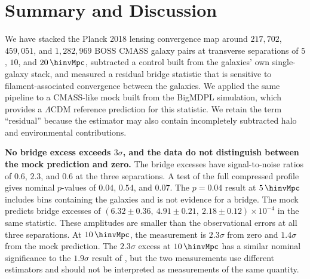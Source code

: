 %

\section{Summary and Discussion}
\label{sec:discussion}

We have stacked the Planck 2018 lensing convergence map around $217{,}702$,
$459{,}051$, and $1{,}282{,}969$ BOSS CMASS galaxy pairs at transverse
separations of $5$, $10$, and $20\,\hinvMpc$,
subtracted a control built from the galaxies' own single-galaxy stack, and
measured a residual bridge statistic that is sensitive to filament-associated
convergence between the galaxies. We applied the same pipeline to a
CMASS-like mock built from the BigMDPL simulation, which provides a
$\Lambda$CDM reference prediction for this statistic. We retain the term
``residual'' because the estimator may also contain incompletely subtracted
halo and environmental contributions.

\textbf{No bridge excess exceeds $3\sigma$, and the data do not distinguish
between the mock prediction and zero.} The bridge excesses have
signal-to-noise ratios of $0.6$, $2.3$, and $0.6$ at the three separations. A
test of the full compressed profile gives nominal $p$-values of $0.04$,
$0.54$, and $0.07$.
The $p=0.04$ result at $5\,\hinvMpc$ includes bins containing the galaxies and
is not evidence for a bridge. The mock predicts bridge excesses of
$\left(6.32\pm0.36,\ 4.91\pm0.21,\ 2.18\pm0.12\right)\times10^{-4}$ in the
same statistic. These amplitudes are smaller than the observational errors
at all three separations. At $10\,\hinvMpc$, the measurement is $2.3\sigma$
from zero and $1.4\sigma$ from the mock prediction.
The $2.3\sigma$ excess at $10\,\hinvMpc$ has a similar nominal significance
to the $1.9\sigma$ result of \citet{deGraaff2019}, but the two measurements
use different estimators and should not be interpreted as measurements of
the same quantity.

